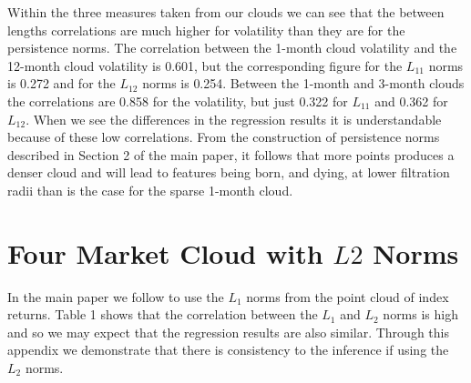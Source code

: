 \documentclass{article}
\begin{document}
Within the three measures taken from our clouds we can see that the between lengths correlations are much higher for volatility than they are for the persistence norms. The correlation between the 1-month cloud volatility and the 12-month cloud volatility is 0.601, but the corresponding figure for the $L_{11}$ norms is 0.272 and for the $L_{12}$ norms is 0.254. Between the 1-month and 3-month clouds the correlations are 0.858 for the volatility, but just 0.322 for $L_{11}$ and 0.362 for $L_{12}$. When we see the differences in the regression results it is understandable because of these low correlations. From the construction of persistence norms described in Section 2 of the main paper, it follows that more points produces a denser cloud and will lead to features being born, and dying, at lower filtration radii than is the case for the sparse 1-month cloud.

\section{Four Market Cloud with $L2$ Norms}

In the main paper we follow \cite{gidea2018topological} to use the $L_1$ norms from the point cloud of index returns. Table 1 shows that the correlation between the $L_1$ and $L_2$ norms is high and so we may expect that the regression results are also similar. Through this appendix we demonstrate that there is consistency to the inference if using the $L_2$ norms.
\end{document}
